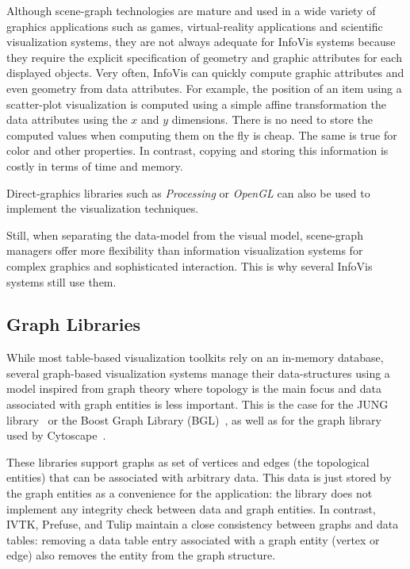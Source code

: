 Although scene-graph technologies are mature and used in a wide
variety of graphics applications such as games, virtual-reality
applications and scientific visualization systems, they are not always
adequate for InfoVis systems because they require the explicit
specification of geometry and graphic attributes for each displayed
objects.  Very often, InfoVis can quickly compute graphic attributes
and even geometry from data attributes.  For example, the position of
an item using a scatter-plot visualization is computed using a simple
affine transformation the data attributes using the $x$ and $y$
dimensions.  There is no need to store the computed values when
computing them on the fly is cheap.  The same is true for color and
other properties.  In contrast, copying and storing this information
is costly in terms of time and memory.

Direct-graphics libraries such as \emph{Processing} or \emph{OpenGL}
can also be used to implement the visualization techniques. 


Still, when separating the data-model from the visual model,
scene-graph managers offer more flexibility than information
visualization systems for complex graphics and sophisticated
interaction.  This is why several InfoVis systems
still use them.


\subsection{Graph Libraries}

While most table-based visualization toolkits rely on an in-memory
database, several graph-based visualization systems manage their
data-structures using a model inspired from graph theory where
topology is the main focus and data associated with graph entities is
less important.  This is the case for the JUNG library~\cite{jung2003}
or the Boost Graph Library (BGL)~\cite{BGL}, as well as for the graph
library used by Cytoscape~\cite{Cytoscape}.

These libraries support graphs as set of vertices and edges (the
topological entities) that can be associated with arbitrary data.
This data is just stored by the graph entities as a convenience for
the application: the library does not implement any integrity check
between data and graph entities.  In contrast, IVTK, Prefuse, and
Tulip maintain a close consistency between graphs and data tables:
removing a data table entry associated with a graph entity (vertex or
edge) also removes the entity from the graph structure.

